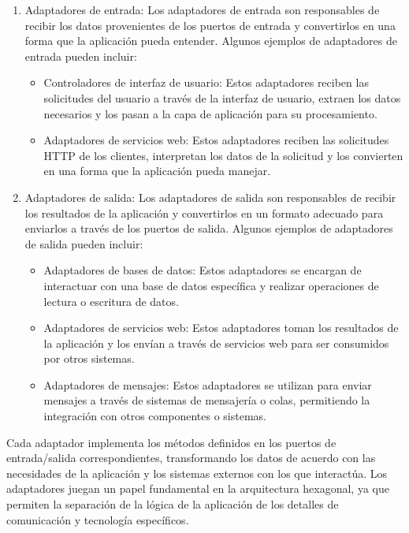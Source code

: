 \documentclass[executivepaper]{article}
\begin{document}
\begin{enumerate}
    \item Adaptadores de entrada:
    Los adaptadores de entrada son responsables de recibir los datos provenientes de los puertos de entrada y convertirlos en una forma que la aplicación pueda entender. Algunos ejemplos de adaptadores de entrada pueden incluir:
    \begin{itemize}
        \item Controladores de interfaz de usuario: Estos adaptadores reciben las solicitudes del usuario a través de la interfaz de usuario, extraen los datos necesarios y los pasan a la capa de aplicación para su procesamiento.
        \item Adaptadores de servicios web: Estos adaptadores reciben las solicitudes HTTP de los clientes, interpretan los datos de la solicitud y los convierten en una forma que la aplicación pueda manejar.
    \end{itemize}
    \item Adaptadores de salida:
    Los adaptadores de salida son responsables de recibir los resultados de la aplicación y convertirlos en un formato adecuado para enviarlos a través de los puertos de salida. Algunos ejemplos de adaptadores de salida pueden incluir:
    \begin{itemize}
        \item Adaptadores de bases de datos: Estos adaptadores se encargan de interactuar con una base de datos específica y realizar operaciones de lectura o escritura de datos.
        \item Adaptadores de servicios web: Estos adaptadores toman los resultados de la aplicación y los envían a través de servicios web para ser consumidos por otros sistemas.
        \item Adaptadores de mensajes: Estos adaptadores se utilizan para enviar mensajes a través de sistemas de mensajería o colas, permitiendo la integración con otros componentes o sistemas.
    \end{itemize}
\end{enumerate}
Cada adaptador implementa los métodos definidos en los puertos de entrada/salida correspondientes, transformando los datos de acuerdo con las necesidades de la aplicación y los sistemas externos con los que interactúa. Los adaptadores juegan un papel fundamental en la arquitectura hexagonal, ya que permiten la separación de la lógica de la aplicación de los detalles de comunicación y tecnología específicos.
\end{document}
